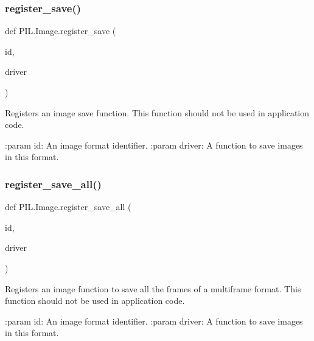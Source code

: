 \subsubsection{\texorpdfstring{register\+\_\+save()}{register\_save()}}
{\footnotesize\ttfamily def P\+I\+L.\+Image.\+register\+\_\+save (\begin{DoxyParamCaption}\item[{}]{id,  }\item[{}]{driver }\end{DoxyParamCaption})}

\begin{DoxyVerb}Registers an image save function.  This function should not be
used in application code.

:param id: An image format identifier.
:param driver: A function to save images in this format.
\end{DoxyVerb}
 \mbox{\label{namespacePIL_1_1Image_af606d8e47c135fb44fba756579c00997}} 
\subsubsection{\texorpdfstring{register\+\_\+save\+\_\+all()}{register\_save\_all()}}
{\footnotesize\ttfamily def P\+I\+L.\+Image.\+register\+\_\+save\+\_\+all (\begin{DoxyParamCaption}\item[{}]{id,  }\item[{}]{driver }\end{DoxyParamCaption})}

\begin{DoxyVerb}Registers an image function to save all the frames
of a multiframe format.  This function should not be
used in application code.

:param id: An image format identifier.
:param driver: A function to save images in this format.
\end{DoxyVerb}
 \mbox{\label{namespacePIL_1_1Image_a3b6ec14aecc634f1071a1f464ce4da6a}} 
